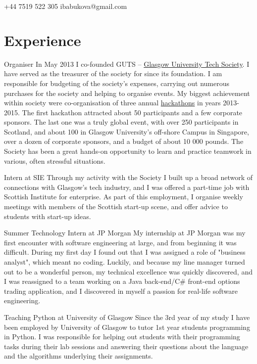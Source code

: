 \documentclass{tccv}
\begin{document}
\newpage

    {+44 7519 522 305}
    {ibabukova@gmail.com}



\section{Experience}

\begin{skillist}

\item{Organiser} {In May 2013 I co-founded GUTS -- \href{http://gutechsoc.com}{Glasgow University Tech Society}. I have served as the treasurer of the society for since its foundation. I am responsible for budgeting of the society's expenses, carrying out numerous purchases for the society and helping to organise events. My biggest achievement within society were co-organisation of three annual \href{http://storify.com/Eventhread/gu-hackaton}{hackathons} in years 2013-2015. The first hackathon attracted about 50 participants and a few corporate sponsors. The last one was a truly global event, with over 250 participants in Scotland, and about 100 in Glasgow University's off-shore Campus in Singapore, over a dozen of corporate sponsors, and a budget of about 10 000 pounds. The Society has been a great hands-on opportunity to learn and practice teamwork in various, often stressful situations.}
\item{Intern at SIE} {Through my activity with the Society I built up a broad network of connections with Glasgow's tech industry, and I was offered a part-time job with Scottish Institute for enterprise. As part of this employment, I organise weekly meetings with members of the Scottish start-up scene, and offer advice to students with start-up ideas. }

\item{Summer Technology Intern at JP Morgan} {My internship at JP Morgan was my first encounter with software engineering at large, and from beginning it was difficult. During my first day I found out that I was assigned a role of "business analyst", which meant no coding. Luckily, and because my line manager turned out to be a wonderful person, my technical excellence was quickly discovered, and I was reassigned to a team working on a Java back-end/C\# front-end options trading application, and I discovered in myself a passion for real-life software engineering.}
\newpage
\item{Teaching Python at University of Glasgow} {Since the 3rd year of my study I have been employed by University of Glasgow to tutor 1st year students programming in Python. I was responsible for helping out students with their programming tasks during their lab sessions and answering their questions about the language and the algorithms underlying their assignments.}


\end{skillist}
\end{document}
